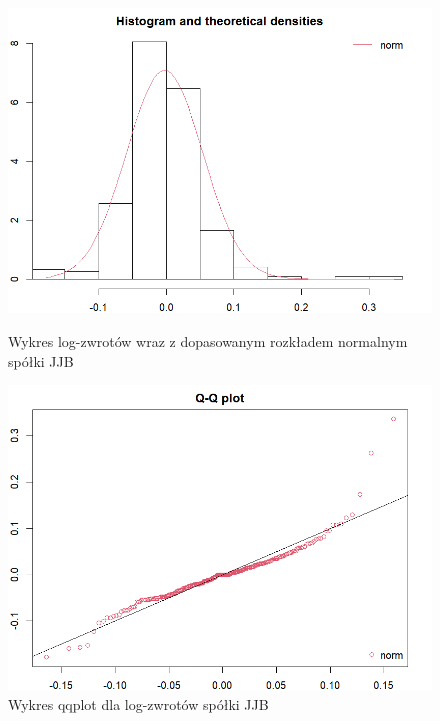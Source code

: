 \documentclass[a4paper,11pt]{article}
\begin{document}
\begin{figure}[!htb]
    \begin{minipage}{0.48\textwidth}
        \centering
        \includegraphics[width=\linewidth]{images/jjb_histwykres_log.png}
        \caption{Wykres log-zwrotów wraz z dopasowanym rozkładem normalnym spółki JJB}
        \label{fig:jjb_histwykres_log}
    \end{minipage}\hfill
    \begin{minipage}{0.48\textwidth}
        \centering
        \includegraphics[width=\linewidth]{images/jjb_qqplot_log.png}
        \caption{Wykres qqplot dla log-zwrotów spółki JJB}
        \label{fig:jjb_qqplot_log}
    \end{minipage}
    \vspace{\baselineskip}

\end{figure}
\end{document}
